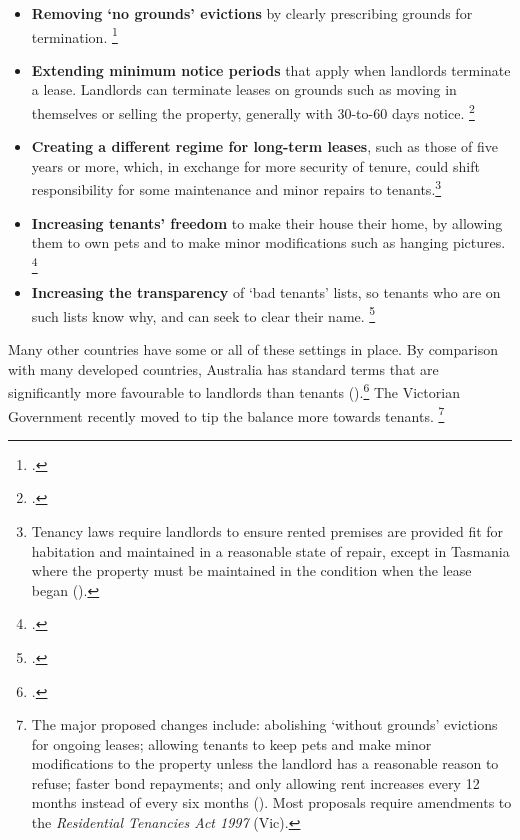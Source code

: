 \begin{itemize}
\item
  \textbf{Removing `no grounds' evictions} by clearly prescribing grounds for termination.%
  \footcite{KellyHarrisonHunterEtAl2013}
\item
  \textbf{Extending minimum notice periods} that apply when landlords terminate a lease. Landlords can terminate leases on grounds such as moving in themselves or selling the property, generally with 30-to-60 days notice.%
	\footcite{Hulse-etal-2011-AHURI-Secure-occupancy-rental-housing}
\item
  \textbf{Creating a different regime for long-term leases}, such as those of five years or more, which, in exchange for more security of tenure, could shift responsibility for some maintenance and minor repairs to tenants.\footnote{Tenancy laws require  landlords to ensure rented premises are provided fit for habitation and maintained in a reasonable state of repair, except in Tasmania where the property must be maintained in the condition when the lease began (\textcite{Martin2017renting}).}
\item
  \textbf{Increasing tenants' freedom} to make their house their home, by allowing them to own pets and to make minor modifications such as hanging pictures.%
	\footcites{KellyHarrisonHunterEtAl2013}{Vic-makingrentingfair}
\item
  \textbf{Increasing the transparency} of `bad tenants' lists, so tenants who are on such lists know why, and can seek to clear their name.
  \footcites{Irvine-2016-SMH-Hidden-tax-hurts-renters}{Natl-Shelter-2017-Life-in-Aust-private-rental-market}
\end{itemize}

Many other countries have some or all of these settings in place.
By comparison with many developed countries, Australia has standard terms that are significantly more favourable to landlords than tenants ().\footcite[][8]{Hulse-etal-2011-AHURI-Secure-occupancy-rental-housing}
The Victorian Government recently moved to tip the balance more towards tenants.%
    \footnote{The major proposed changes include: abolishing `without grounds' evictions for ongoing leases; allowing tenants to keep pets and make minor modifications to the property unless the landlord has a reasonable reason to refuse; faster bond repayments; and only allowing rent increases every 12 months instead of every six months (\textcite{Vic-makingrentingfair}).
    Most proposals require amendments to the \emph{Residential Tenancies Act 1997} (Vic).}

